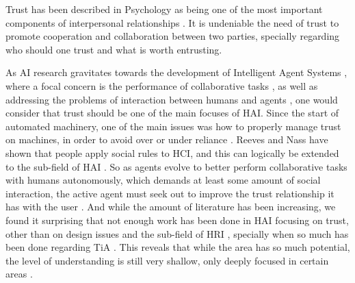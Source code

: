 \label{chap:intro}

Trust has been described in Psychology as being one of the most important components of interpersonal relationships \cite{Simpson2007}. It is undeniable the need of trust to promote cooperation and collaboration between two parties, specially regarding who should one trust and what is worth entrusting.


As \ac{AI} research gravitates towards the development of Intelligent Agent Systems \cite{Russell2009a}, where a focal concern is the performance of collaborative tasks \cite{Grosz1996, Allen2002, Allen2007}, as well as addressing the problems of interaction between humans and agents \cite{Bradshaw2011}, one would consider that trust should be one of the main focuses of \ac{HAI}. Since the start of automated machinery, one of the main issues was how to properly manage trust on machines, in order to avoid over or under reliance \cite{Lee2004}. Reeves and Nass have shown that people apply social rules to \ac{HCI}, and this can logically be extended to the sub-field of \ac{HAI} \cite{Reeves1998a}. So as agents evolve to better perform collaborative tasks with humans autonomously, which demands at least some amount of social interaction, the active agent must seek out to improve the trust relationship it has with the user \cite{Lashkari1994}. And while the amount of literature has been increasing, we found it surprising that not enough work has been done in \ac{HAI} focusing on trust, other than on design issues \cite{Bickmore2005} and the sub-field of \ac{HRI} \cite{Goodrich2007, VandenBrule2014}, specially when so much has been done regarding \ac{TiA} \cite{Lee1992, Jones1997, Lee2004}. This reveals that while the area has so much potential, the level of understanding is still very shallow, only deeply focused in certain areas \cite{Granatyr2015}.

